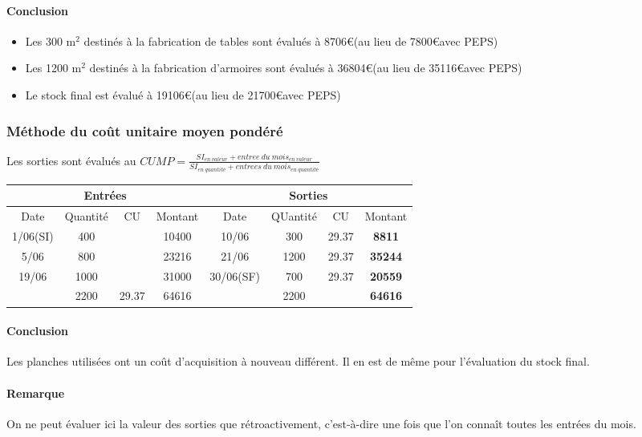 \documentclass[12pt,a4paper,openany]{report}
\begin{document}
	 \paragraph{Conclusion}
	 \begin{itemize}
		 \item Les 300 m$^2$ destinés à la fabrication de tables sont évalués à 8706\euro (au lieu de 7800\euro avec PEPS)
		 \item Les 1200 m$^2$ destinés à la fabrication d'armoires sont évalués à 36804\euro (au lieu de 35116\euro avec PEPS)
		 \item Le stock final est évalué à 19106\euro (au lieu de 21700\euro avec PEPS)
	 \end{itemize}
	 \subsubsection{Méthode du coût unitaire moyen pondéré}
	 Les sorties sont évalués au $CUMP = \frac{SI_{en~valeur} + entree~du~mois_{en~valeur}}{SI_{en~quantité} + entrees~du~mois_{en~quantité}}$\\
	 \begin{tabular}{|c|c|c|c| |c|c|c|c|}
		 \hline
		 \multicolumn{4}{|c||}{Entrées} & \multicolumn{4}{c|}{Sorties}\\
		 \hline
		 Date & Quantité & CU & Montant & Date & QUantité & CU & Montant\\
		 \hline
		 1/06(SI) & 400 & &10400&10/06&300&29.37&\textbf{8811}\\
		 5/06&800&&23216&21/06&1200&29.37&\textbf{35244}\\
		 19/06&1000&&31000&30/06(SF)&700&29.37&\textbf{20559}\\
		 \hline
		 &2200&29.37&64616&&2200&&\textbf{64616}\\
		 \hline
	 \end{tabular}
	 \paragraph{Conclusion}
	 Les planches utilisées ont un coût d'acquisition à nouveau différent. Il en est de même pour l'évaluation du stock final.
	 \paragraph{Remarque}
	 On ne peut évaluer ici la valeur des sorties que rétroactivement, c'est-à-dire une fois que l'on connaît toutes les entrées du mois.
\end{document}
